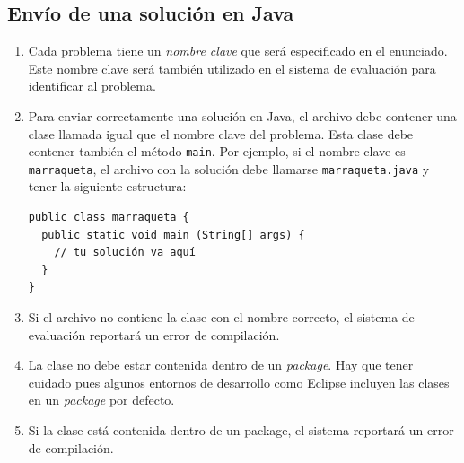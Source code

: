 \documentclass[12pt]{oci}
\begin{document}

\subsection*{Envío de una solución en Java}

\begin{enumerate}
  \item Cada problema tiene un \emph{nombre clave} que será especificado en el
    enunciado.
    Este nombre clave será también utilizado en el sistema de evaluación
    para identificar al problema.
  \item Para enviar correctamente una solución en Java, el archivo debe contener
    una clase llamada igual que el nombre clave del problema.
    Esta clase debe contener también el método \verb+main+.
    Por ejemplo, si el nombre clave es \texttt{marraqueta}, el archivo con la
    solución debe llamarse \texttt{marraqueta.java} y tener la siguiente
    estructura:

\begin{verbatim}
public class marraqueta {
  public static void main (String[] args) {
    // tu solución va aquí
  }
}
\end{verbatim}
  \item Si el archivo no contiene la clase con el nombre correcto, el sistema de
    evaluación reportará un error de compilación.

  \item La clase no debe estar contenida dentro de un \emph{package}.
      Hay que tener cuidado pues algunos entornos de desarrollo como Eclipse
    incluyen las clases en un \emph{package} por defecto.
  \item Si la clase está contenida dentro de un package, el sistema reportará un
    error de compilación.
\end{enumerate}
\end{document}
